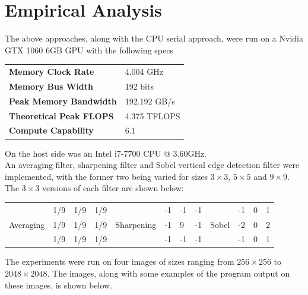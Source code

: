 \documentclass[10pt]{article}
\begin{document}
\section{Empirical Analysis}\label{EmpiricalAnalysis}
The above approaches, along with the CPU serial approach, were run on a Nvidia GTX 1060 6GB GPU with the following specs
\begin{table}[H]
\begin{tabular}{ll}
\textbf{Memory Clock Rate}     & 4.004 GHz    \\
\textbf{Memory Bus Width}      & 192 bits     \\
\textbf{Peak Memory Bandwidth} & 192.192 GB/s \\
\textbf{Theoretical Peak FLOPS} & 4.375 TFLOPS \\
\textbf{Compute Capability}    & 6.1         
\end{tabular}
\end{table}
On the host side was an Intel i7-7700 CPU @ 3.60GHz. 
\\
An averaging filter, sharpening filter and Sobel vertical edge detection filter were implemented, with the former two being varied for sizes $3\times3$, $5\times5$ and $9\times9$. The $3\times3$ versions of each filter are shown below:
\begin{table}[H]
\begin{tabular}{l|l|l|l|c|l|l|l|l|l|l|l|}
\cline{2-4} \cline{6-8} \cline{10-12}
          & 1/9 & 1/9 & 1/9 &            & -1 & -1 & -1 &       & -1 & 0 & 1 \\ \cline{2-4} \cline{6-8} \cline{10-12} 
Averaging & 1/9 & 1/9 & 1/9 & Sharpening & -1 & 9  & -1 & Sobel & -2 & 0 & 2 \\ \cline{2-4} \cline{6-8} \cline{10-12} 
          & 1/9 & 1/9 & 1/9 &            & -1 & -1 & -1 &       & -1 & 0 & 1 \\ \cline{2-4} \cline{6-8} \cline{10-12} 
\end{tabular}
\end{table}
The experiments were run on four images of sizes ranging from $256 \times 256$ to $2048 \times 2048$. The images, along with some examples of the program output on these images, is shown below.
\end{document}

